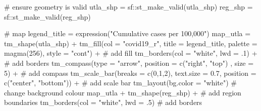 \documentclass[
  letterpaper,
  DIV=11,
  numbers=noendperiod,
  oneside]{scrreprt}
\newenvironment{Shaded}{\begin{snugshade}}{\end{snugshade}}
\newcommand{\AttributeTok}[1]{\textcolor[rgb]{0.40,0.45,0.13}{#1}}
\newcommand{\CommentTok}[1]{\textcolor[rgb]{0.37,0.37,0.37}{#1}}
\newcommand{\DecValTok}[1]{\textcolor[rgb]{0.68,0.00,0.00}{#1}}
\newcommand{\FloatTok}[1]{\textcolor[rgb]{0.68,0.00,0.00}{#1}}
\newcommand{\FunctionTok}[1]{\textcolor[rgb]{0.28,0.35,0.67}{#1}}
\newcommand{\NormalTok}[1]{\textcolor[rgb]{0.00,0.23,0.31}{#1}}
\newcommand{\OtherTok}[1]{\textcolor[rgb]{0.00,0.23,0.31}{#1}}
\newcommand{\SpecialCharTok}[1]{\textcolor[rgb]{0.37,0.37,0.37}{#1}}
\newcommand{\StringTok}[1]{\textcolor[rgb]{0.13,0.47,0.30}{#1}}
\begin{document}
\begin{Shaded}
\begin{Highlighting}[]
\CommentTok{\# ensure geometry is valid}
\NormalTok{utla\_shp }\OtherTok{=}\NormalTok{ sf}\SpecialCharTok{::}\FunctionTok{st\_make\_valid}\NormalTok{(utla\_shp)}
\NormalTok{reg\_shp }\OtherTok{=}\NormalTok{ sf}\SpecialCharTok{::}\FunctionTok{st\_make\_valid}\NormalTok{(reg\_shp)}

\CommentTok{\# map}
\NormalTok{legend\_title }\OtherTok{=} \FunctionTok{expression}\NormalTok{(}\StringTok{"Cumulative cases per 100,000"}\NormalTok{)}
\NormalTok{map\_utla }\OtherTok{=} \FunctionTok{tm\_shape}\NormalTok{(utla\_shp) }\SpecialCharTok{+}
  \FunctionTok{tm\_fill}\NormalTok{(}\AttributeTok{col =} \StringTok{"covid19\_r"}\NormalTok{, }\AttributeTok{title =}\NormalTok{ legend\_title, }\AttributeTok{palette =} \FunctionTok{magma}\NormalTok{(}\DecValTok{256}\NormalTok{), }\AttributeTok{style =} \StringTok{"cont"}\NormalTok{) }\SpecialCharTok{+} \CommentTok{\# add fill}
  \FunctionTok{tm\_borders}\NormalTok{(}\AttributeTok{col =} \StringTok{"white"}\NormalTok{, }\AttributeTok{lwd =}\NormalTok{ .}\DecValTok{1}\NormalTok{)  }\SpecialCharTok{+} \CommentTok{\# add borders}
  \FunctionTok{tm\_compass}\NormalTok{(}\AttributeTok{type =} \StringTok{"arrow"}\NormalTok{, }\AttributeTok{position =} \FunctionTok{c}\NormalTok{(}\StringTok{"right"}\NormalTok{, }\StringTok{"top"}\NormalTok{) , }\AttributeTok{size =} \DecValTok{5}\NormalTok{) }\SpecialCharTok{+} \CommentTok{\# add compass}
  \FunctionTok{tm\_scale\_bar}\NormalTok{(}\AttributeTok{breaks =} \FunctionTok{c}\NormalTok{(}\DecValTok{0}\NormalTok{,}\DecValTok{1}\NormalTok{,}\DecValTok{2}\NormalTok{), }\AttributeTok{text.size =} \FloatTok{0.7}\NormalTok{, }\AttributeTok{position =}  \FunctionTok{c}\NormalTok{(}\StringTok{"center"}\NormalTok{, }\StringTok{"bottom"}\NormalTok{)) }\SpecialCharTok{+} \CommentTok{\# add scale bar}
  \FunctionTok{tm\_layout}\NormalTok{(}\AttributeTok{bg.color =} \StringTok{"white"}\NormalTok{) }\CommentTok{\# change background colour}
\NormalTok{map\_utla }\SpecialCharTok{+} \FunctionTok{tm\_shape}\NormalTok{(reg\_shp) }\SpecialCharTok{+} \CommentTok{\# add region boundaries}
  \FunctionTok{tm\_borders}\NormalTok{(}\AttributeTok{col =} \StringTok{"white"}\NormalTok{, }\AttributeTok{lwd =}\NormalTok{ .}\DecValTok{5}\NormalTok{) }\CommentTok{\# add borders}
\end{Highlighting}
\end{Shaded}
\end{document}
